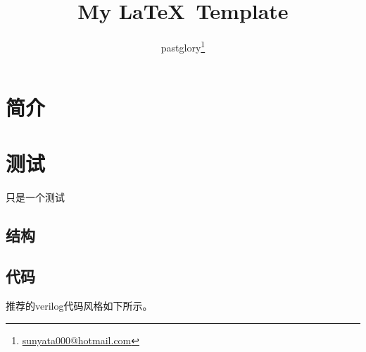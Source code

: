 \documentclass[zh]{pgreport}
\title {My \LaTeX\ Template}
\author{pastglory\thanks{\href{mailto:sunyata000@hotmail.com}{sunyata000@hotmail.com}}}
\date{}
\begin{document}
\maketitle
\tableofcontents
\begin{abstract}

\end{abstract}

\section{简介}


\section{测试}
只是一个测试

\subsection{结构}


\subsection{代码}
推荐的verilog代码风格如下所示。



\end{document}
